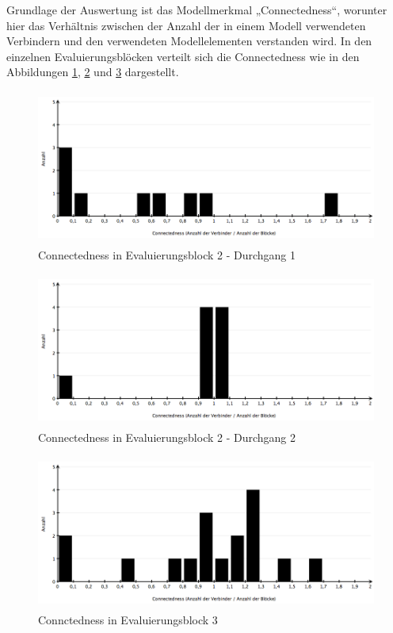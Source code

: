 Grundlage der Auswertung ist das Modellmerkmal „Connectedness“, worunter hier das Verhältnis zwischen der Anzahl der in einem Modell verwendeten Verbindern und den verwendeten Modellelementen verstanden wird. In den einzelnen Evaluierungsblöcken verteilt sich die Connectedness wie in den Abbildungen \ref{fig:img_Evaluierung_connectednessAushandlung1}, \ref{fig:img_Evaluierung_connectednessAushandlung2} und \ref{fig:img_Evaluierung_connectednessConceptMapping} dargestellt.

\begin{figure}[htbp]
	\centering
		\includegraphics[height=2in]{img/Evaluierung/connectednessAushandlung1.png}
	\caption{Connectedness in Evaluierungsblock 2 - Durchgang 1}
	\label{fig:img_Evaluierung_connectednessAushandlung1}
\end{figure}

\begin{figure}[htbp]
	\centering
		\includegraphics[height=2in]{img/Evaluierung/connectednessAushandlung2.png}
	\caption{Connectedness in Evaluierungsblock 2 - Durchgang 2}
	\label{fig:img_Evaluierung_connectednessAushandlung2}
\end{figure}

\begin{figure}[htbp]
	\centering
		\includegraphics[height=2in]{img/Evaluierung/connectednessConceptMapping.png}
	\caption{Connctedness in Evaluierungsblock 3}
	\label{fig:img_Evaluierung_connectednessConceptMapping}
\end{figure}

